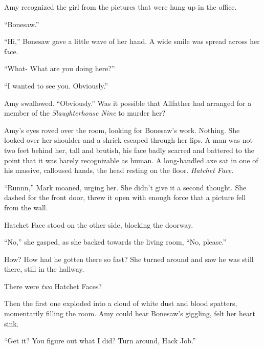 Amy recognized the girl from the pictures that were hung up in the office.



``Bonesaw.''



``Hi,'' Bonesaw gave a little wave of her hand.  A wide smile was spread across her face.



``What- What are you doing here?''



``I wanted to see you.  Obviously.''



Amy swallowed.  ``Obviously.''  Was it possible that Allfather had arranged for a member of the \emph{Slaughterhouse Nine} to murder her?



Amy's eyes roved over the room, looking for Bonesaw's work.  Nothing.  She looked over her shoulder and a shriek escaped through her lips.  A man was not two feet behind her, tall and brutish, his face badly scarred and battered to the point that it was barely recognizable as human.  A long-handled axe sat in one of his massive, calloused hands, the head resting on the floor.  \emph{Hatchet Face}.



``Runnn,'' Mark moaned, urging her.  She didn't give it a second thought.  She dashed for the front door, threw it open with enough force that a picture fell from the wall.



Hatchet Face stood on the other side, blocking the doorway.



``No,'' she gasped, as she backed towards the living room, ``No, please.''



How?  How had he gotten there so fast?  She turned around and saw he was still there, still in the hallway.



There were \emph{two} Hatchet Faces?



Then the first one exploded into a cloud of white dust and blood spatters, momentarily filling the room.  Amy could hear Bonesaw's giggling, felt her heart sink.



``Get it?  You figure out what I did?  Turn around, Hack Job.''



